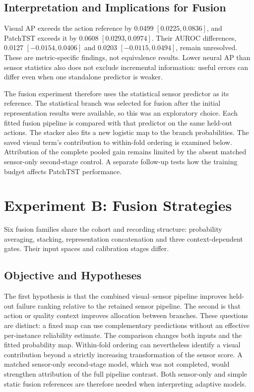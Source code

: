 \subsection{Interpretation and Implications for Fusion}
Visual AP exceeds the action reference by 0.0499 $[0.0225, 0.0836]$, and PatchTST exceeds
it by 0.0608 $[0.0293, 0.0974]$. Their AUROC differences, 0.0127 $[-0.0154, 0.0406]$ and
0.0203 $[-0.0115, 0.0494]$, remain unresolved. These are metric-specific findings, not
equivalence results. Lower neural AP than sensor statistics also does not exclude
incremental information: useful errors can differ even when one standalone predictor is
weaker.

The fusion experiment therefore uses the statistical sensor predictor as its reference.
The statistical branch was selected for fusion after the initial representation results
were available, so this was an exploratory choice.
Each fitted fusion pipeline is compared with that predictor on the same held-out
actions. The stacker also fits a new logistic map to the branch probabilities. The saved
visual term's contribution to within-fold ordering is examined below. Attribution of the
complete pooled gain remains limited by the absent matched sensor-only second-stage
control. A separate follow-up tests how the training budget affects PatchTST
performance.

\section{Experiment B: Fusion Strategies}
Six fusion families share the cohort and recording structure: probability averaging,
stacking, representation concatenation and three context-dependent gates. Their input
spaces and calibration stages differ.

\subsection{Objective and Hypotheses}
The first hypothesis is that the combined visual--sensor pipeline improves held-out
failure ranking relative to the retained sensor pipeline. The second is that action or
quality context improves allocation between branches. These questions are distinct: a
fixed map can use complementary predictions without an effective per-instance
reliability estimate. The comparison changes both inputs and the fitted probability map.
Within-fold ordering can nevertheless identify a visual contribution beyond a strictly
increasing transformation of the sensor score. A matched sensor-only second-stage model,
which was not completed, would strengthen attribution of the full pipeline contrast.
Both sensor-only and simple static fusion references are therefore needed when
interpreting adaptive models.

